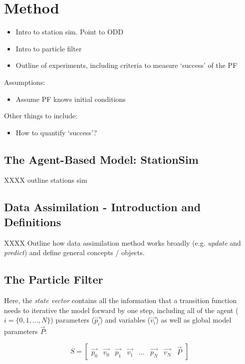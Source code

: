 \section{Method\label{Method}}

\begin{itemize}
\item Intro to station sim. Point to ODD
\item Intro to particle filter
\item Outline of experiments, including criteria to measure `success' of the PF
\end{itemize}

Assumptions:

\begin{itemize}
\item Assume PF knows initial conditions
\end{itemize}

Other things to include: 
\begin{itemize}
\item How to quantify `success'?
\end{itemize}


\subsection{The Agent-Based Model: StationSim}

XXXX outline stations sim


\subsection{Data Assimilation - Introduction and Definitions}

XXXX Outline how data assimilation method works broadly (e.g. \textit{update} and \textit{predict}) and define general concepts / objects.


\subsection{The Particle Filter}

Here, the \textit{state vector} contains all the information that a transition function needs to iterative the model forward by one step, including all of the agent ($i = \{ 0, 1, \dots, N \} $) parameters ($\overrightarrow{p_i}$) and variables ($\overrightarrow{v_i}$) as well as global model parameters $\overrightarrow{P}$:

\begin{equation}
  S  = \left[ \begin{array}{cccccccc}
\overrightarrow{p_0} & \overrightarrow{v_0} & \overrightarrow{p_1} &  \overrightarrow{v_1} &  \dots &  \overrightarrow{p_N} &  \overrightarrow{v_N} & \overrightarrow{P} 
\end{array} \right]
\end{equation} 

